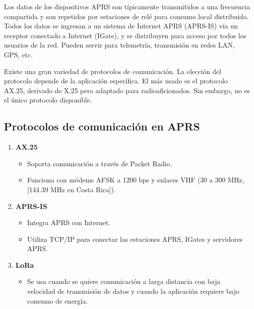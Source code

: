 \documentclass[conference]{IEEEtran}
\begin{document}
Los datos de los dispositivos APRS son típicamente transmitidos a una frecuencia compartida y son repetidos por estaciones de relé para consumo local distribuido. Todos los datos se ingresan a un sistema de Internet APRS (APRS-IS) vía un receptor conectado a Internet (IGate), y se distribuyen para acceso por todos los usuarios de la red. Pueden servir para telemetría, transmisión en redes LAN, GPS, etc.

\vspace{2mm}

Existe una gran variedad de protocolos de comunicación. La elección del protocolo depende de la aplicación específica. El más usado es el protocolo AX.25, derivado de X.25 pero adaptado para radioaficionados. Sin embargo, no es el único protocolo disponible.

\vspace{2mm}

\subsection*{\textbf{Protocolos de comunicación en APRS}}

\begin{enumerate}
    \item \textbf{AX.25}  
    \begin{itemize}
        \item Soporta comunicación a través de Packet Radio.  
        \item Funciona con módems AFSK a 1200 bps y enlaces VHF (30 a 300 MHz, [144.39 MHz en Costa Rica]).
    \end{itemize}

    \item \textbf{APRS-IS}  
    \begin{itemize}
        \item Integra APRS con Internet.  
        \item Utiliza TCP/IP para conectar las estaciones APRS, IGates y servidores APRS.
    \end{itemize}

    \item \textbf{LoRa}  
    \begin{itemize}
        \item Se usa cuando se quiere comunicación a larga distancia con baja velocidad de transmisión de datos y cuando la aplicación requiere bajo consumo de energía.
    \end{itemize}
\end{enumerate}
\end{document}
